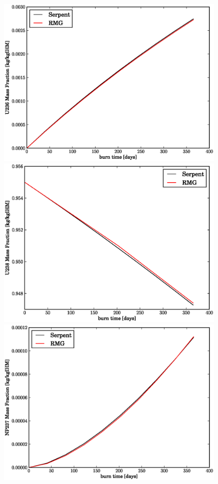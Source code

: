 \begin{figure}[htbp]
\begin{center}
\includegraphics[scale=0.3]{multigroup_method/figs/benchmark/U236_Mass_Fraction_.eps}
\includegraphics[scale=0.3]{multigroup_method/figs/benchmark/U238_Mass_Fraction_.eps}
\includegraphics[scale=0.3]{multigroup_method/figs/benchmark/NP237_Mass_Fraction_.eps}

\end{center}
\end{figure}
